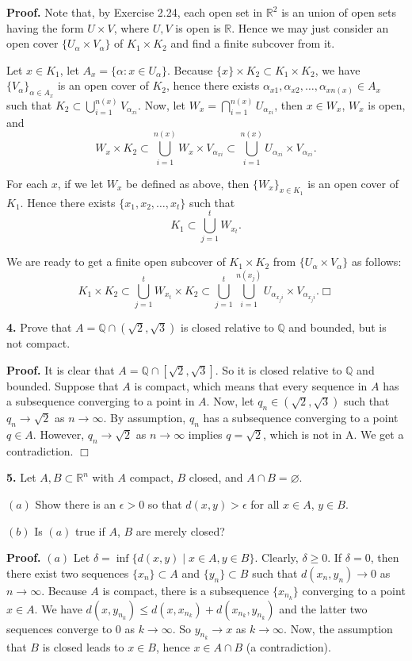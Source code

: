 \documentclass{article}
\begin{document}
\textbf{Proof.} Note that, by Exercise 2.24, each open set in
$\mathbb{R}^2$ is an union of open sets having the form $U\times V$,
where $U, V$ is open is $\mathbb{R}$. Hence we may just consider an open
cover $\{U_{\alpha}\times V_{\alpha}\}$ of $K_1\times K_2$ and find a
finite subcover from it.

Let $x\in K_1$, let $A_x = \{\alpha: x\in U_{\alpha}\}$. Because
$\{x\}\times K_2 \subset K_1 \times K_2$, we have
$\{V_{\alpha}\}_{\alpha \in A_x}$ is an open cover of $K_2$, hence there
exists $\alpha_{x1},\alpha_{x2},\ldots,\alpha_{xn(x)} \in A_x$ such that
$K_2 \subset \bigcup_{i=1}^{n(x)}V_{\alpha_{xi}}$. Now, let
$W_x =\bigcap_{i=1}^{n(x)}U_{\alpha_{xi}}$, then $x \in W_x$, $W_x$ is
open, and
\[ W_x \times K_2 \subset \bigcup_{i=1}^{n(x)}W_{x}\times V_{\alpha_{xi}}\subset \bigcup_{i=1}^{n(x)}U_{\alpha_{xi}}\times V_{\alpha_{xi}}.\]

For each $x$, if we let $W_x$ be defined as above, then
$\{W_x\}_{x\in K_1}$ is an open cover of $K_1$. Hence there exists
$\{x_1,x_2,\ldots,x_t\}$ such that
\[ K_1 \subset \bigcup_{j=1}^{t} W_{x_t}.\]

We are ready to get a finite open subcover of $K_1\times K_2$ from
$\{U_{\alpha}\times V_{\alpha}\}$ as follows: \[
K_1 \times K_2 \subset \bigcup_{j=1}^{t} W_{x_t}\times K_2 \subset \bigcup_{j=1}^{t} \bigcup_{i=1}^{n(x_j)}U_{\alpha_{x_ji}}\times V_{\alpha_{x_ji}}. \Box
\]

    \textbf{4.} Prove that $A = \mathbb{Q} \cap (\sqrt{2},\sqrt{3})$ is
closed relative to $\mathbb{Q}$ and bounded, but is not compact.

\textbf{Proof.} It is clear that
$A = \mathbb{Q} \cap [\sqrt{2},\sqrt{3}]$. So it is closed relative to
$\mathbb{Q}$ and bounded. Suppose that $A$ is compact, which means that
every sequence in $A$ has a subsequence converging to a point in $A$.
Now, let $q_n \in (\sqrt{2},\sqrt{3})$ such that $q_n \to \sqrt{2}$ as
$n\to \infty$. By assumption, $q_n$ has a subsequence converging to a
point $q\in A$. However, $q_n \to \sqrt{2}$ as $n\to \infty$ implies
$q = \sqrt{2}$, which is not in A. We get a contradiction. $\Box$

    \textbf{5.} Let $A,B\subset \mathbb{R}^n$ with $A$ compact, $B$ closed,
and $A\cap B = \varnothing$.

$(a)$ Show there is an $\epsilon > 0$ so that $d(x,y) > \epsilon$ for
all $x\in A$, $y\in B$.

$(b)$ Is $(a)$ true if $A$, $B$ are merely closed?

\textbf{Proof.} $(a)$ Let $\delta = \inf\{d(x,y)\mid x\in A, y\in B\}$.
Clearly, $\delta \ge 0$. If $\delta = 0$, then there exist two sequences
$\{x_n\}\subset A$ and $\{y_n\}\subset B$ such that $d(x_n,y_n)\to 0$ as
$n \to \infty$. Because $A$ is compact, there is a subsequence
$\{x_{n_k}\}$ converging to a point $x \in A$. We have
$d(x,y_{n_k}) \le d(x,x_{n_k}) + d(x_{n_k},y_{n_k})$ and the latter two
sequences converge to $0$ as $k \to \infty$. So $y_{n_k} \to x$ as
$k \to \infty$. Now, the assumption that $B$ is closed leads to
$x \in B$, hence $x\in A\cap B$ (a contradiction).
\end{document}
